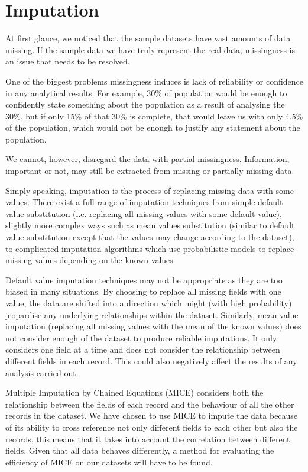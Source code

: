 \documentclass[bsc]{abdnthesis}
\begin{document}
\section{Imputation} %
\label{sec:imputation}
At first glance, we noticed that the sample datasets have vast amounts of data missing. If the sample data we have truly represent the real data, missingness is an issue that needs to be resolved. 

One of the biggest problems missingness induces is lack of reliability or confidence in any analytical results. For example, 30\% of population would be enough to confidently state something about the population as a result of analysing the 30\%, but if only 15\% of that 30\% is complete, that would leave us with only 4.5\% of the population, which would not be enough to justify any statement about the population. 

We cannot, however, disregard the data with partial missingness. Information, important or not, may still be extracted from missing or partially missing data. 

Simply speaking, imputation is the process of replacing missing data with some values\cite{ imp}. There exist a full range of imputation techniques from simple default value substitution (i.e. replacing all missing values with some default value)\cite{ imp-default}, slightly more complex ways such as mean values substitution \cite{ imp-mean}(similar to default value substitution except that the values may change according to the dataset), to complicated imputation algorithms which use probabilistic models to replace missing values depending on the known values\cite{ imp-mice, imp-mi}. 

Default value imputation techniques may not be appropriate as they are too biased in many situations. By choosing to replace all missing fields with one value, the data are shifted into a direction which might (with high probability) jeopardise any underlying relationships within the dataset. Similarly, mean value imputation (replacing all missing values with the mean of the known values) does not consider enough of the dataset to produce reliable imputations. It only considers one field at a time and does not consider the relationship between different fields in each record. This could also negatively affect the results of any analysis carried out. 

Multiple Imputation by Chained Equations (MICE) \cite{imp-mice} considers both the relationship between the fields of each record and the behaviour of all the other records in the dataset. We have chosen to use MICE to impute the data because of its ability to cross reference not only different fields to each other but also the records, this means that it takes into account the correlation between different fields. Given that all data behaves differently, a method for evaluating the efficiency of MICE on our datasets will have to be found. 
\end{document}
